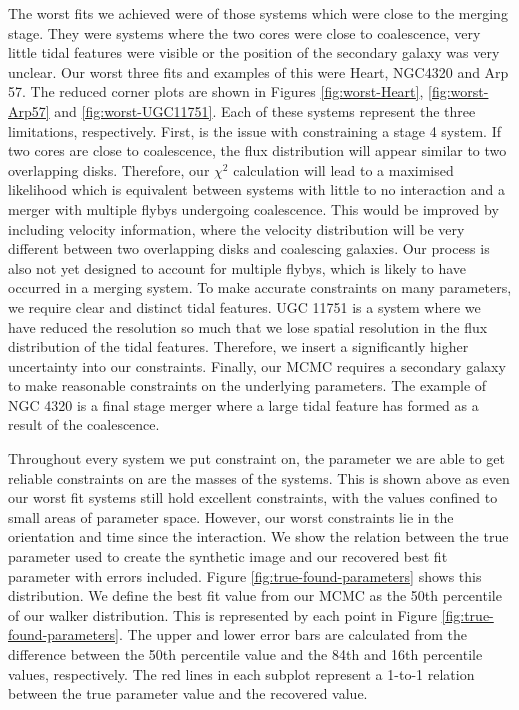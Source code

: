 The worst fits we achieved were of those systems which were close to the merging stage. They were systems where the two cores were close to coalescence, very little tidal features were visible or the position of the secondary galaxy was very unclear. Our worst three fits and examples of this were Heart, NGC4320 and Arp 57. The reduced corner plots are shown in Figures \ref{fig:worst-Heart}, \ref{fig:worst-Arp57} and \ref{fig:worst-UGC11751}. Each of these systems represent the three limitations, respectively. First, is the issue with constraining a stage 4 system. If two cores are close to coalescence, the flux distribution will appear similar to two overlapping disks. Therefore, our $\chi^{2}$ calculation will lead to a maximised likelihood which is equivalent between systems with little to no interaction and a merger with multiple flybys undergoing coalescence. This would be improved by including velocity information, where the velocity distribution will be very different between two overlapping disks and coalescing galaxies. Our process is also not yet designed to account for multiple flybys, which is likely to have occurred in a merging system. To make accurate constraints on many parameters, we require clear and distinct tidal features. UGC 11751 is a system where we have reduced the resolution so much that we lose spatial resolution in the flux distribution of the tidal features. Therefore, we insert a significantly higher uncertainty into our constraints. Finally, our MCMC requires a secondary galaxy to make reasonable constraints on the underlying parameters. The example of NGC 4320 is a final stage merger where a large tidal feature has formed as a result of the coalescence.

Throughout every system we put constraint on, the parameter we are able to get reliable constraints on are the masses of the systems. This is shown above as even our worst fit systems still hold excellent constraints, with the values confined to small areas of parameter space. However, our worst constraints lie in the orientation and time since the interaction. We show the relation between the true parameter used to create the synthetic image and our recovered best fit parameter with errors included. Figure \ref{fig:true-found-parameters} shows this distribution. We define the best fit value from our MCMC as the 50th percentile of our walker distribution. This is represented by each point in Figure \ref{fig:true-found-parameters}. The upper and lower error bars are calculated from the difference between the 50th percentile value and the 84th and 16th percentile values, respectively. The red lines in each subplot represent a 1-to-1 relation between the true parameter value and the recovered value. 


